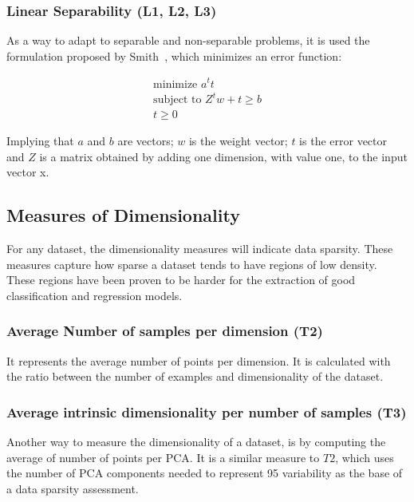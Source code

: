 \subsubsection{Linear Separability (L1, L2, L3)}

As a way to adapt to separable and non-separable problems, it is used the 
formulation proposed by Smith~\cite{FWSmith}, which minimizes an error function:

\begin{align*} 
 \text{minimize } a^{t}t \\
 \text{subject to } Z^{t}w + t \geq b \\
 t \geq 0 
\end{align*}

Implying that $a$ and $b$ are vectors; $w$ is the weight vector; $t$ is the 
error vector and $Z$ is a matrix obtained by adding one dimension, with value 
one, to the input vector x.

\subsection{Measures of Dimensionality}\label{sec:dimesionality}

For any dataset, the dimensionality measures will indicate data sparsity.
These measures capture how sparse a dataset tends to have regions of low 
density. These regions have been proven to be harder for the extraction of 
good classification and regression models.

\subsubsection{Average Number of samples per dimension (T2)}

It represents the average number of points per dimension. It is calculated with 
the ratio between the number of examples and dimensionality of the dataset.

\subsubsection{Average intrinsic dimensionality per number of samples (T3)}

Another way to measure the dimensionality of a dataset, is by computing the 
average of number of points per PCA. It is a similar measure to $T2$, which
uses the number of PCA components needed to represent 95 variability as
the base of a data sparsity assessment.

